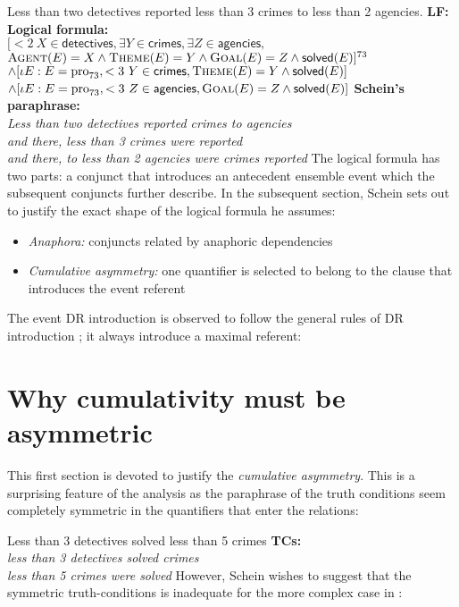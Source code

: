\documentclass[english]{article}
\newcommand{\ag}{\textsc{Agent}\xspace}
\newcommand{\thm}{\textsc{Theme}\xspace}
\newcommand{\goal}{\textsc{Goal}\xspace}
\newcommand{\fg}{\color{darkred}}
\newcommand{\bg}{\color{blueish}}
\begin{document}
\pex
\a 
Less than two detectives reported less than 3 crimes to less than 2 agencies. 
\a 
\textbf{LF:}\\

\a \textbf{Logical formula:}\\
{\bg $[<2\ X \in\textsf{detectives}, \exists Y\in\textsf{crimes}, \exists Z\in\textsf{agencies},$\\
$\ag(E) = X \wedge \thm(E) = Y \wedge \goal(E) = Z \wedge \textsf{solved}(E)]^{73}$}\\[1ex]
{\fg $\wedge [\iota E: E = \text{pro}_{73},  <3\ Y\in\textsf{crimes}, \thm(E) = Y \wedge \textsf{solved}(E)]$\\
$\wedge [\iota E: E = \text{pro}_{73},  <3\ Z\in\textsf{agencies}, \goal(E) = Z \wedge \textsf{solved}(E)]$
}
\a \textbf{Schein's paraphrase:}\\
\emph{
Less than two detectives reported crimes to agencies\\
and there, less than 3 crimes were reported\\
and there, to less than 2 agencies were crimes reported
}
\xe
%
The logical formula has two parts: a {\bg conjunct} that introduces an antecedent ensemble event  which the subsequent {\fg conjuncts} further describe. In the subsequent section, Schein sets out to justify the exact shape of the logical formula he assumes:

\begin{itemize}
	\item \emph{Anaphora:} conjuncts related by anaphoric dependencies
	\item \emph{Cumulative asymmetry:} one quantifier is selected to belong to the clause that introduces the event referent
\end{itemize}
%
The event DR introduction is observed to follow the general rules of DR introduction ; it always introduce a maximal referent:


\section{Why cumulativity must be asymmetric}

This first section is devoted to justify the \emph{cumulative asymmetry}. This is a surprising feature of the analysis as the paraphrase of the truth conditions seem completely symmetric in the quantifiers that enter the relations:

\pex
\a 
Less than 3 detectives solved less than 5 crimes
\a \textbf{TCs:}\\
\emph{less than 3 detectives solved crimes}\\
\emph{less than 5 crimes were solved}
\xe
%
However, Schein wishes to suggest that the symmetric truth-conditions is inadequate for the more complex case in \cnextx:
\end{document}
